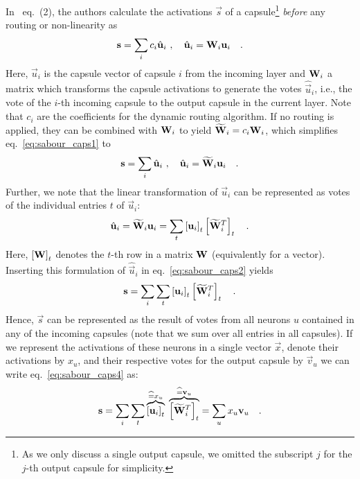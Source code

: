 In~ eq.~(2), the authors calculate the activations $\vec s$ of a capsule\footnote{
    As we only discuss a single output capsule, we omitted the subscript $j$ for the $j$-th output capsule for simplicity.} \emph{before} any routing
    or non-linearity as 
%
\begin{align}
    \label{eq:sabour_caps1}
    \vec s = \sum_i c_{i}\hat{\vec u}_{i}\,\,, \quad \hat{\vec u}_{i} = \mat{W}_{i} \vec u_i\quad\text{.}
\end{align}
Here, $\vec{u}_i$ is the capsule vector of capsule $i$ from the incoming layer and 
    $\mat W_{i}$ a matrix which transforms the capsule activations to generate the votes $\hat{\vec u}_{i}$,
    i.e., the vote of the $i$-th incoming capsule to the output capsule in the current layer.
    Note that $c_{i}$ are the coefficients for the dynamic routing algorithm. If no routing is applied, they
        can be combined with $\mat W_{i}$ to yield $\widetilde{\mat{W}}_{i} = c_{i}\mat W_{i}$,
    which simplifies eq.~\eqref{eq:sabour_caps1} to
\begin{align}
    \label{eq:sabour_caps2}
    \vec s = \sum_i \hat{\vec u}_{i}\,\,, \quad \hat{\vec u}_{i} = \widetilde{\mat{W}}_{i} \vec u_i\quad\text{.}
\end{align}
Further, we note that the linear transformation of $\vec u_i$ can be represented as votes of the individual
    entries $t$ of $\vec u_i$:
\begin{align}
    \label{eq:sabour_caps3}
    \hat{\vec u}_{i} = \widetilde{\mat{W}}_{i} \vec u_i = \sum_t \left[\vec u_i\right]_t \left[\widetilde{\mat W}_{i}^T\right]_t \quad\text{.}
\end{align}  
Here, 
    $\left[ \mat W\right]_t$ denotes the $t$-th row in a matrix $\mat W$ (equivalently for a vector).
Inserting this formulation of $\hat{\vec u}_{i}$ in eq.~\eqref{eq:sabour_caps2} yields
\begin{align}
    \label{eq:sabour_caps4}
    \vec s = \sum_i \sum_t \left[\vec u_i\right]_t \left[\widetilde{\mat W}_{i}^T\right]_t \quad\text{.}
\end{align}
Hence, $\vec s$ can be represented as the result of votes from all neurons $u$ contained in any of the incoming capsules (note that we sum over all entries in all capsules).
If we represent the activations of these neurons in a single vector $\vec x$, denote their activations by $x_u$,
    and their respective votes for the output capsule by ${\vec v}_u$
    we can write eq.~\eqref{eq:sabour_caps4} as:
\begin{align}
   \vec s = \sum_i \sum_t \displaystyle\overbrace{\left[\vec u_i\right]_t}^{\widehat{=} x_u} \;
                                \overbrace{\left[\widetilde{\mat W}_{i}^T\right]_t}^{\widehat{=} {\vec v}_u}
                                = \sum_u x_u {\vec v}_u
    \quad\text{.}
    \label{eq:sabour_caps6}
\end{align}
